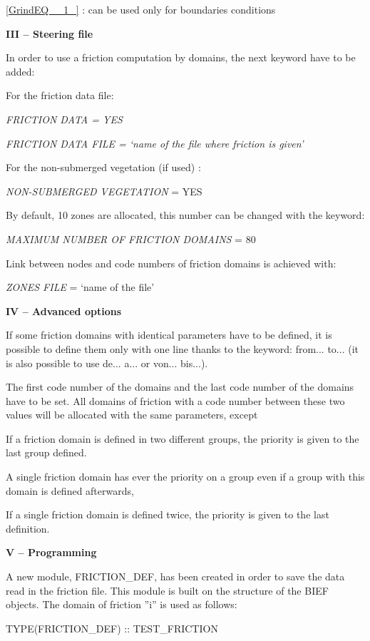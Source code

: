 \documentclass{article} %
\begin{document}
\eqref{GrindEQ__1_} : can be used only for boundaries conditions

 \textbf{}

 \textbf{ III -- Steering file}

 In order to use a friction computation by domains, the next keyword have to be added:

 For the friction data file:

 \textit{FRICTION DATA = YES}

 \textit{FRICTION DATA FILE = `name of the file where friction is given'}

 For the non-submerged vegetation (if used) :

 \textit{NON-SUBMERGED VEGETATION} = YES

 By default, 10 zones are allocated, this number can be changed with the keyword:

 \textit{MAXIMUM NUMBER OF FRICTION DOMAINS} = 80

 Link between nodes and code numbers of friction domains is achieved with:

 \textit{ZONES FILE} = `name of the file'

 \textbf{IV -- Advanced options}

 If some friction domains with identical parameters have to be defined, it is possible to define them only with one line thanks to the keyword: from... to... (it is also possible to use de... a... or von... bis...).

 The first code number of the domains and the last code number of the domains have to be set. All domains of friction with a code number between these two values will be allocated with the same parameters, except

 If a friction domain is defined in two different groups, the priority is given to the last group defined.

 A single friction domain has ever the priority on a group even if a group with this domain is defined afterwards,

 If a single friction domain is defined twice, the priority is given to the last definition.

 \textbf{ V -- Programming}

 A new module, FRICTION\_DEF, has been created in order to save the data read in the friction file. This module is built on the structure of the BIEF objects. The domain of friction ''i'' is used as follows:

 TYPE(FRICTION\_DEF) :: TEST\_FRICTION
\end{document}
